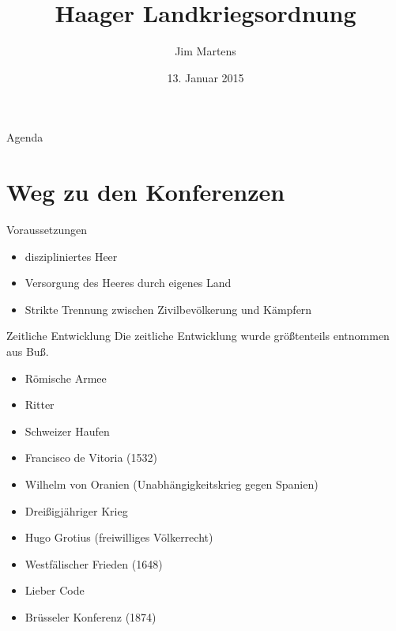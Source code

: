 \documentclass{beamer}
\begin{document}
\author{Jim Martens}
\title{Haager Landkriegsordnung}
\date{13. Januar 2015}

\begin{frame}
    \titlepage
\end{frame}

\begin{frame}{Agenda}
    \tableofcontents
\end{frame}

\section{Weg zu den Konferenzen}
\begin{frame}{Voraussetzungen}
    \begin{itemize}
        \item diszipliniertes Heer
        \item Versorgung des Heeres durch eigenes Land
        \item Strikte Trennung zwischen Zivilbevölkerung und Kämpfern
    \end{itemize}
\end{frame}

\begin{frame}{Zeitliche Entwicklung}
    Die zeitliche Entwicklung wurde größtenteils entnommen aus Buß\cite{Buss1992}.
    \begin{itemize}
        \item Römische Armee
        \item Ritter
        \item Schweizer Haufen
        \item Francisco de Vitoria (1532)
        \item Wilhelm von Oranien (Unabhängigkeitskrieg gegen Spanien)
        \item Dreißigjähriger Krieg
        \item Hugo Grotius (freiwilliges Völkerrecht)
        \item Westfälischer Frieden (1648)
        \item Lieber Code
        \item Brüsseler Konferenz (1874)
    \end{itemize}
\end{frame}
\end{document}
